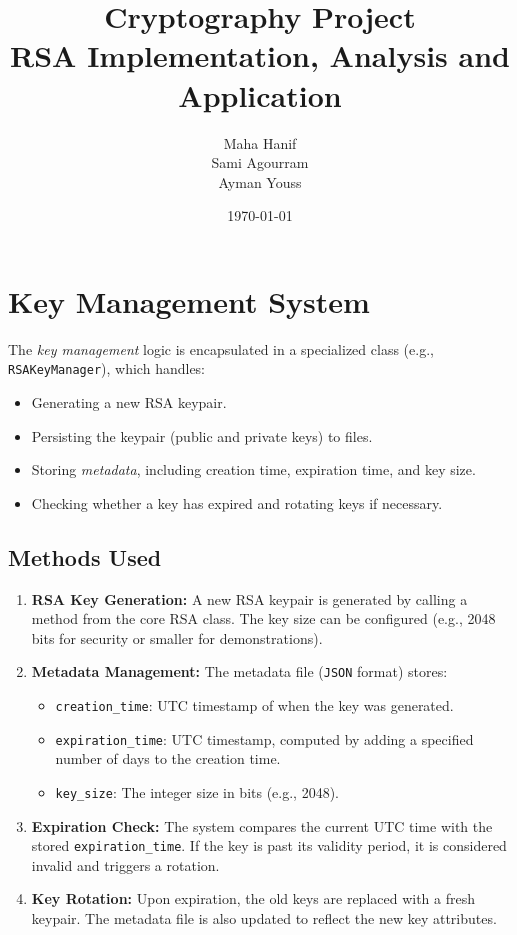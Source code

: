 \documentclass[12pt]{article}
\title{Cryptography Project \\
       \large RSA Implementation, Analysis and Application}
\author{Maha Hanif \\
        Sami Agourram \\
        Ayman Youss}
\date{\today}
\begin{document}
\maketitle

\tableofcontents
\clearpage


\section{Key Management System}
The \emph{key management} logic is encapsulated in a specialized class (e.g., \texttt{RSAKeyManager}), which handles:
\begin{itemize}
    \item Generating a new RSA keypair.
    \item Persisting the keypair (public and private keys) to files.
    \item Storing \emph{metadata}, including creation time, expiration time, and key size.
    \item Checking whether a key has expired and rotating keys if necessary.
\end{itemize}

\subsection{Methods Used}
\begin{enumerate}
    \item \textbf{RSA Key Generation:} 
    A new RSA keypair is generated by calling a method from the core RSA class. The key size can be configured (e.g., 2048 bits for security or smaller for demonstrations).
    
    \item \textbf{Metadata Management:}
    The metadata file (\texttt{JSON} format) stores:
    \begin{itemize}
        \item \texttt{creation\_time}: UTC timestamp of when the key was generated.
        \item \texttt{expiration\_time}: UTC timestamp, computed by adding a specified number of days to the creation time.
        \item \texttt{key\_size}: The integer size in bits (e.g., 2048).
    \end{itemize}

    \item \textbf{Expiration Check:}
    The system compares the current UTC time with the stored \texttt{expiration\_time}. If the key is past its validity period, it is considered invalid and triggers a rotation.

    \item \textbf{Key Rotation:}
    Upon expiration, the old keys are replaced with a fresh keypair. The metadata file is also updated to reflect the new key attributes.
\end{enumerate}
\end{document}
